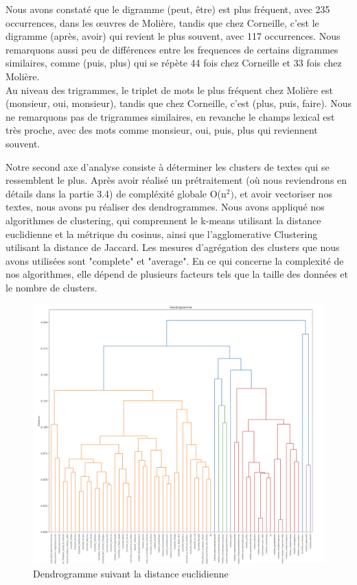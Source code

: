 \hspace{0,5cm}Nous avons constaté que le digramme (peut, être) est plus fréquent,
avec 235 occurrences, dans les œuvres de Molière, tandis que chez Corneille,
c'est le digramme (après, avoir) qui revient le plus souvent, avec 117
occurrences. Nous remarquons aussi peu de différences entre les frequences de
certains digrammes similaires, comme (puis, plus) qui se répète 44 fois chez
Corneille et 33 fois chez Molière.
\\Au niveau des trigrammes, le triplet de mots le plus fréquent chez Molière est
(monsieur, oui, monsieur), tandis que chez Corneille, c'est (plus, puis, faire).
Nous ne remarquons pas de trigrammes similaires, en revanche le champs lexical
est très proche, avec des mots comme monsieur, oui, puis, plus qui reviennent
souvent.

\vspace{\baselineskip}

\hspace{0,5cm}Notre second axe d'analyse consiste à déterminer les clusters de
textes qui se ressemblent le plus. Après avoir réalisé un prétraitement (où nous
reviendrons en détails dans la partie 3.4) de compléxité globale O(n\(^2)\), et
avoir vectoriser nos textes, nous avons pu réaliser des dendrogrammes.
Nous avons appliqué nos algorithmes de clustering, qui comprennent le
k-means utilisant la distance euclidienne et la métrique du cosinus, ainsi que
l'agglomerative Clustering utilisant la distance de Jaccard. Les mesures
d'agrégation des clusters que nous avons utilisées sont "complete" et
"average". En ce qui concerne la complexité de nos algorithmes, elle dépend de
plusieurs facteurs tels que la taille des données et le nombre de clusters.

\begin{figure}[htbp]
  \centering
  \includegraphics[width=15cm]{Ressources/Dendo_eucli.png}
  \caption{Dendrogramme suivant la distance euclidienne}
  \label{fig:images}
\end{figure}

